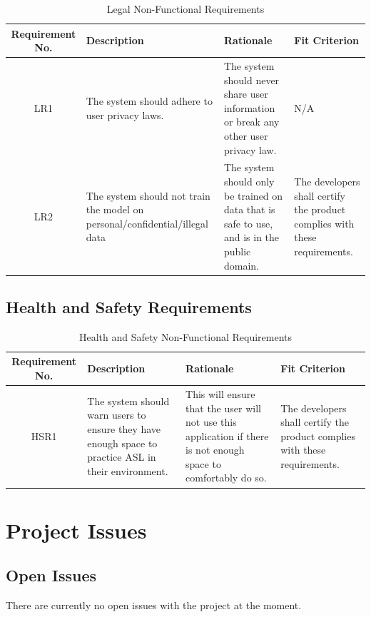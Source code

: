 \documentclass[12pt, titlepage]{article}
\begin{document}
\begin{table}[H]
\caption{Legal Non-Functional Requirements}
\noindent \begin{tabular}{| c | p{3cm}| p{3cm}| p{3cm}|}
\hline 
\textbf{Requirement No.} & \textbf{Description} & \textbf{Rationale} & \textbf{Fit Criterion}\\
\hline
LR1 & The system should adhere to user privacy laws. &  The system should never share user information or break any other user privacy law. & N/A \\
\hline
LR2 & The system should not train the model on personal/confidential/illegal data & The system should only be trained on data that is safe to use, and is in the public domain. & The developers shall certify the product complies with these requirements. \\
\bottomrule
\end{tabular}
\end{table}

\subsection{Health and Safety Requirements}

\begin{table}[H]
\caption{Health and Safety Non-Functional Requirements}
\noindent \begin{tabular}{| c | p{3cm}| p{3cm}| p{3cm}|}
\hline 
\textbf{Requirement No.} & \textbf{Description} & \textbf{Rationale} & \textbf{Fit Criterion}\\
\hline
HSR1 & The system should warn users to ensure they have enough space to practice ASL in their environment. & This will ensure that the user will not use this application if there is not enough space to comfortably do so. & The developers shall certify the product complies with these requirements. \\
\bottomrule
\end{tabular}
\end{table}

\section{Project Issues}

\subsection{Open Issues}
There are currently no open issues with the project at the moment.
\end{document}
